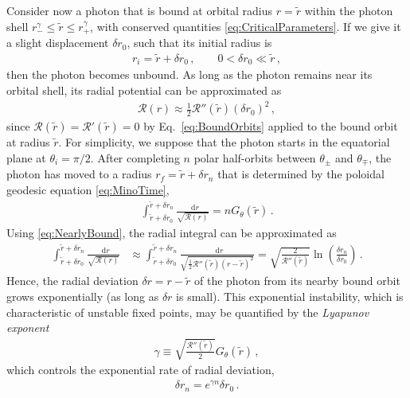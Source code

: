 \documentclass[graybox,envcountchap]{svmult}
\newcommand{\ed}{\mathop{}\!\mathrm{d}}
\newcommand{\pa}[1]{\left(#1\right)}
\begin{document}
Consider now a photon that is bound at orbital radius $r=\tilde{r}$ within the photon shell $r^\gamma_-\le\tilde{r}\le r^\gamma_+$, with conserved quantities \eqref{eq:CriticalParameters}.
If we give it a slight displacement $\delta r_0$, such that its initial radius is
\begin{align}
    r_i=\tilde{r}+\delta r_0\,,\qquad
    0<\delta r_0\ll\tilde{r}\,,
\end{align}
then the photon becomes unbound.
As long as the photon remains near its orbital shell, its radial potential can be approximated as
\begin{align}
    \label{eq:NearlyBound}
    \mathcal{R}(r)\approx\frac{1}{2}\mathcal{R}''(\tilde{r})\pa{\delta r_0}^2\,,
\end{align}
since $\mathcal{R}(\tilde{r})=\mathcal{R}'(\tilde{r})=0$ by Eq.~\eqref{eq:BoundOrbits} applied to the bound orbit at radius $\tilde{r}$.
For simplicity, we suppose that the photon starts in the equatorial plane at $\theta_i=\pi/2$.
After completing $n$ polar half-orbits between $\theta_\pm$ and $\theta_\mp$, the photon has moved to a radius $r_f=\tilde{r}+\delta r_n$ that is determined by the poloidal geodesic equation \eqref{eq:MinoTime},
\begin{align}
    \int_{\tilde{r}+\delta r_0}^{\tilde{r}+\delta r_n}\frac{\ed r}{\sqrt{\mathcal{R}(r)}}=nG_\theta(\tilde{r})\,.
\end{align}
Using \eqref{eq:NearlyBound}, the radial integral can be approximated as
\begin{align}
    \int_{\tilde{r}+\delta r_0}^{\tilde{r}+\delta r_n}\frac{\ed r}{\sqrt{\mathcal{R}(r)}}&\approx\int_{\tilde{r}+\delta r_0}^{\tilde{r}+\delta r_n}\frac{\ed r}{\sqrt{\frac{1}{2}\mathcal{R}''(\tilde{r})(r-\tilde{r})^2}}
    =\sqrt{\frac{2}{\mathcal{R}''(\tilde{r})}}\ln\pa{\frac{\delta r_n}{\delta r_0}}\,. 
\end{align}
Hence, the radial deviation $\delta r=r-\tilde{r}$ of the photon from its nearby bound orbit grows exponentially (as long as $\delta r$ is small).
This exponential instability, which is characteristic of unstable fixed points, may be quantified by the \emph{Lyapunov exponent}
\begin{align}
    \gamma\equiv\sqrt{\frac{\mathcal{R}''(\tilde{r})}{2}}G_\theta(\tilde{r})\,,
\end{align}
which controls the exponential rate of radial deviation,
\begin{align}
    \delta r_n=e^{\gamma n}\delta r_0\,.
\end{align}
\end{document}
